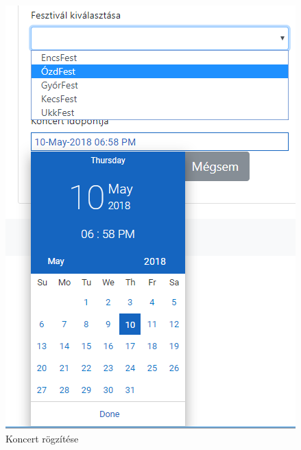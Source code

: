 \begin{figure}[h!]
\centering
\includegraphics[scale=0.64]{kepek/concertUpOpen.png}
\caption{Koncert rögzítése}
\label{fig:concertOpen}
\end{figure}
